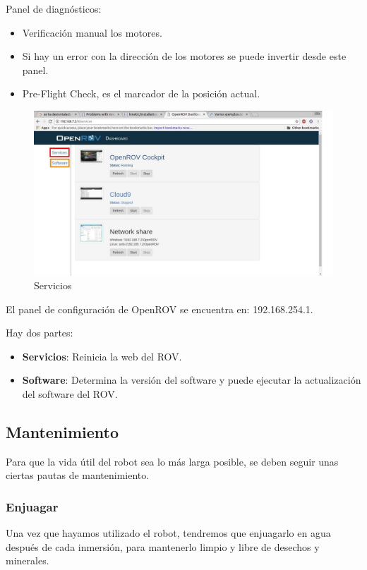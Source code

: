 Panel de diagnósticos:
\begin{itemize}
 \item Verificación manual los motores.
 \item Si hay un error con la dirección de los motores se puede invertir desde este panel.
 \item Pre-Flight Check, es el marcador de la posición actual.
\end{itemize}

\begin{figure} [hbtp]
\begin{center}
  \includegraphics[width=15cm]{img/cap3/3_5/services}
\end{center}
\caption{Servicios}
\label{fig:services}
\end{figure}

El panel de configuración de OpenROV se encuentra en: 192.168.254.1.

Hay dos partes:
\begin{itemize}
\item[\textcolor{red}{\textbullet}]\textbf{Servicios}: Reinicia la web del ROV.
\item[\textcolor{orange}{\textbullet}]\textbf{Software}: Determina la versión del software y puede ejecutar la actualización del software del ROV.
\end{itemize}

\subsection{Mantenimiento}
\label{subsec:mantenimiento}

Para que la vida útil del robot sea lo más larga posible, se deben seguir unas ciertas pautas de mantenimiento.

\subsubsection{Enjuagar}
\label{subsubsec:enjuagar}
Una vez que hayamos utilizado el robot, tendremos que enjuagarlo en agua después de cada inmersión, para mantenerlo limpio y libre de desechos y minerales.
  
